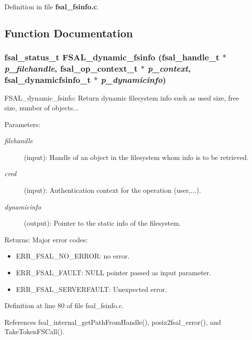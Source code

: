Definition in file {\bf fsal\_\-fsinfo.c}.

\subsection{Function Documentation}
\subsubsection[{FSAL\_\-dynamic\_\-fsinfo}]{\setlength{\rightskip}{0pt plus 5cm}fsal\_\-status\_\-t FSAL\_\-dynamic\_\-fsinfo (fsal\_\-handle\_\-t $\ast$ {\em p\_\-filehandle}, \/  fsal\_\-op\_\-context\_\-t $\ast$ {\em p\_\-context}, \/  fsal\_\-dynamicfsinfo\_\-t $\ast$ {\em p\_\-dynamicinfo})}\label{fsal__fsinfo_8c_95e6b6e10576dbbb619401c3eae1bc2e}


FSAL\_\-dynamic\_\-fsinfo: Return dynamic filesystem info such as used size, free size, number of objects...

\begin{Desc}
\item[Parameters:]
\begin{description}
\item[{\em filehandle}](input): Handle of an object in the filesystem whom info is to be retrieved. \item[{\em cred}](input): Authentication context for the operation (user,...). \item[{\em dynamicinfo}](output): Pointer to the static info of the filesystem.\end{description}
\end{Desc}
\begin{Desc}
\item[Returns:]Major error codes:\begin{itemize}
\item ERR\_\-FSAL\_\-NO\_\-ERROR: no error.\item ERR\_\-FSAL\_\-FAULT: NULL pointer passed as input parameter.\item ERR\_\-FSAL\_\-SERVERFAULT: Unexpected error. \end{itemize}
\end{Desc}


Definition at line 80 of file fsal\_\-fsinfo.c.

References fsal\_\-internal\_\-getPathFromHandle(), posix2fsal\_\-error(), and TakeTokenFSCall().
